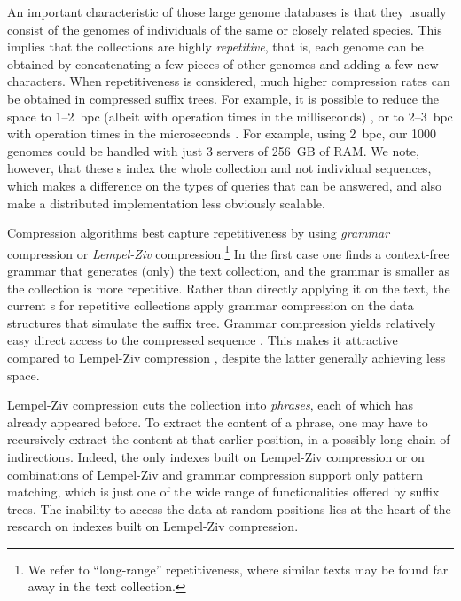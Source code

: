 An important characteristic of those large genome databases is that they
usually consist of the genomes of individuals of the same or closely related
species. This implies that the collections are highly \emph{repetitive}, that
is, each genome can be obtained by concatenating a few pieces of other genomes
and adding a few new characters. When repetitiveness is considered, much higher
compression rates can be obtained in compressed suffix trees. For example, it is possible to reduce
the space to 1--2~bpc (albeit with operation times in the milliseconds)
\cite{Abeliuk2013}, or to 2--3~bpc with operation times in the microseconds
\cite{Navarro2014}. For example, using 2~bpc, our 1000 genomes could be handled
with just 3 servers of 256~GB of RAM. We note, however, that these \CST{}s index
the whole collection and not individual sequences, which makes a difference on
the types of queries that can be answered, and also make a distributed
implementation less obviously scalable.

Compression algorithms best capture repetitiveness by using \emph{grammar}
compression or \emph{Lempel-Ziv} compression.\footnote{We refer to ``long-range''
repetitiveness, where similar texts may be found far away in the text
collection.} In the first case \cite{KY00,CLLPPSS05} one finds a context-free
grammar that generates (only) the text collection, and the grammar is smaller
as the collection is more repetitive. Rather than directly applying it on the
text, the current \CST{}s for repetitive collections \cite{Abeliuk2013,Navarro2014}
apply grammar compression on the data structures that simulate the suffix tree.
Grammar compression yields relatively easy direct access to the compressed
sequence \cite{BLRSRW15}. This makes it attractive compared to Lempel-Ziv
compression \cite{ZL77}, despite the latter generally achieving less space.

Lempel-Ziv compression cuts the collection into \emph{phrases}, each of which
has already appeared before. To extract the content of a phrase, one may have
to recursively extract the content at that earlier position, in a possibly long
chain of indirections.
Indeed, the only indexes built on Lempel-Ziv compression \cite{KN13} or on
combinations of Lempel-Ziv and grammar compression \cite{GGKNP12,GGKNP14,GP15}
support only pattern matching, which is just one of the wide range of
functionalities offered by suffix trees. The inability to access the data
at random positions lies at the heart of the research on indexes built on
Lempel-Ziv compression.

